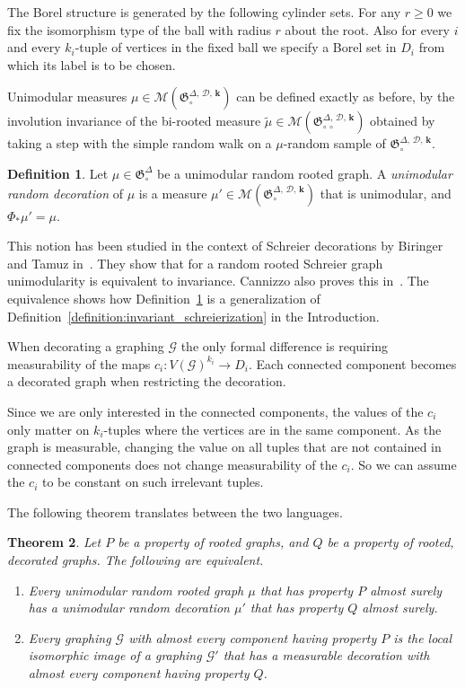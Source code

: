 \documentclass[11pt]{article}
\newtheorem{theo}{Theorem}[section]
\theoremstyle{definition}
\newtheorem{defi}[theo]{Definition}
\numberwithin{equation}{section}
\numberwithin{figure}{section}
\numberwithin{table}{section}
\newcommand{\bfk}{\mathbf{k}}
\newcommand{\G}{\mathcal{G}}
\newcommand{\clM}{\mathcal{M}}
\newcommand{\clD}{\mathcal{D}}
\newcommand{\GoG}{\mathfrak{G}}
\newcommand*{\romanenumi}{\renewcommand*{\theenumi}{\roman{enumi}}}
\begin{document}
The Borel structure is generated by the following cylinder sets. For any $r \geq 0$ we fix the isomorphism type of the ball with radius $r$ about the root. Also for every $i$ and every $k_i$-tuple of vertices in the fixed ball we specify a Borel set in $D_i$ from which its label is to be chosen.

Unimodular measures $\mu \in \clM(\GoG_{\circ}^{\Delta,\,\clD,\,\bfk})$ can be defined exactly as before, by the involution invariance of the bi-rooted measure $\widetilde{\mu} \in \clM(\GoG_{\circ\,\circ}^{\Delta,\,\clD,\,\bfk})$ obtained by taking a step with the simple random walk on a $\mu$-random sample of $\GoG_{\circ}^{\Delta,\,\clD,\,\bfk}$.

\begin{defi}\label{definition:unimodular_decoration}
Let $\mu \in \GoG_{\circ}^{\Delta}$ be a unimodular random rooted graph. A \emph{unimodular random decoration} of $\mu$ is a measure $\mu' \in \clM(\GoG_{\circ}^{\Delta,\,\clD,\,\bfk})$ that is unimodular, and $\Phi_{*}\mu' = \mu$.
\end{defi}

This notion has been studied in the context of Schreier decorations by Biringer and Tamuz in~\cite{biringer2017unimodularity}. They show that for a random rooted Schreier graph unimodularity is equivalent to invariance. Cannizzo also proves this in~\cite{cannizzo2013invariant}. The equivalence shows how Definition~\ref{definition:unimodular_decoration} is a generalization of Definition~\ref{definition:invariant_schreierization} in the Introduction.

When decorating a graphing $\G$ the only formal difference is requiring measurability of the maps $c_i:V(\G)^{k_i} \to D_i$. Each connected component becomes a decorated graph when restricting the decoration.

Since we are only interested in the connected components, the values of the $c_i$ only matter on $k_i$-tuples where the vertices are in the same component. As the graph is measurable, changing the value on all tuples that are not contained in connected components does not change measurability of the $c_i$. So we can assume the $c_i$ to be constant on such irrelevant tuples.

The following theorem translates between the two languages.

\begin{theo}\label{theorem:translation}
Let $P$ be a property of rooted graphs, and $Q$ be a property of rooted, decorated graphs. The following are equivalent.
\begin{enumerate}\romanenumi
\item\label{theo6.3.1} Every unimodular random rooted graph $\mu$ that has property $P$ almost surely has a unimodular random decoration $\mu'$ that has property $Q$ almost surely.
\item\label{theo6.3.2} Every graphing $\G$ with almost every component having property $P$ is the local isomorphic image of a graphing $\G'$ that has a measurable decoration with almost every component having property $Q$.
\end{enumerate}
\end{theo}
\end{document}
